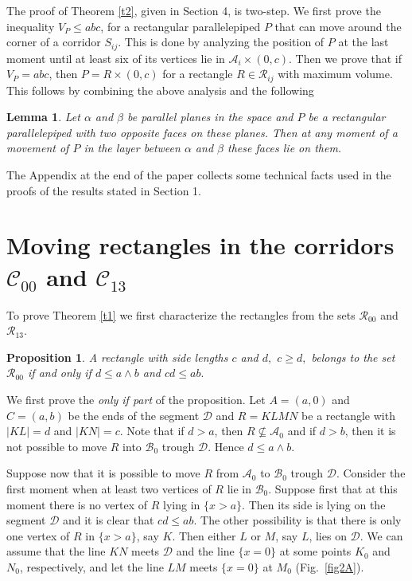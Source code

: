 \documentclass[12pt]{amsart}
\newtheorem{prop}[thm]{Proposition}
\newtheorem{lem}[thm]{Lemma}
\def\A{\mathcal A}
\def\B{\mathcal B}
\def\C{\mathcal C}
\def\D{\mathcal D}
\def\R{\mathcal R}
\def\s{\smallskip}
\def\n{\noindent}
\def\w{\wedge}
\begin{document}
The proof of Theorem \ref{t2}, given in Section 4, is two-step. We
first prove the inequality $V_P\le abc$, for a rectangular
parallelepiped $P$ that can move around the corner of a corridor
$S_{ij}$. This is done by analyzing the position of $P$ at the
last moment until at least six of its vertices lie in
$\A_{i}\times (0,c)$. Then we prove that if $V_P=abc$, then
$P=R\times (0,c)$ for a rectangle $R\in \R_{ij}$ with maximum
volume. This follows by combining the above analysis and the
following \s

\begin{lem} \label{l1} Let $\alpha$ and $\beta$ be parallel planes
in the space and $P$ be a rectangular parallelepiped  with two
opposite faces on these planes. Then at any moment of a movement
of $P$ in the layer between $\alpha$ and $\beta$ these faces lie
on them.
\end{lem}

The Appendix at the end of the paper collects some technical facts
used in the proofs of the results stated in Section 1.

\section{Moving rectangles in the corridors $\C_{00}$ and $ \C_{13}$ }

To prove Theorem \ref{t1} we first characterize the rectangles
from the sets $\R_{00}$  and  $ \R_{13}$.

\begin{prop}\label{p1} A rectangle with side lengths $c$ and $d,$ $c\ge d,$
belongs to the set $\R_{00}$ if and only if $d\le a\w b $ and
$cd\le ab.$
\end{prop}

\n{\it Proof.} We first prove the \emph{only if part} of the
proposition. Let $A=(a,0)$ and $C=(a,b)$ be the ends of the
segment $\mathcal{D}$ and $R=KLMN$ be a rectangle with $|KL|=d$
and $|KN|=c$. Note that if $d>a$, then $R \nsubseteq \A_0$ and if
$d>b$, then it is not possible to move $R$ into $\B_0$ trough
$\D$. Hence $d\le a\w b $.

Suppose now that it is possible to move $R$ from $\A_0$ to $\B_0$
trough $\D$. Consider the first moment when at least two vertices
of $R$ lie in $\B_0$. Suppose first that at this moment there is
no vertex of $R$ lying in $\{x>a\}$. Then its side is lying on
the segment $\mathcal{D}$ and it is clear that $cd\le ab.$ The
other possibility is that there is only one vertex of $R$ in
$\{x>a\}$, say $K$. Then either $L$ or $M$, say $L$, lies on
$\mathcal{D}$. We can assume that the line $KN$ meets $\D$ and the
line $\{x=0\}$ at some points $K_0$ and $N_0$, respectively, and
let the line $LM$ meets $\{x=0\}$ at $M_0$ (Fig.~\ref{fig2A}).
\end{document}
